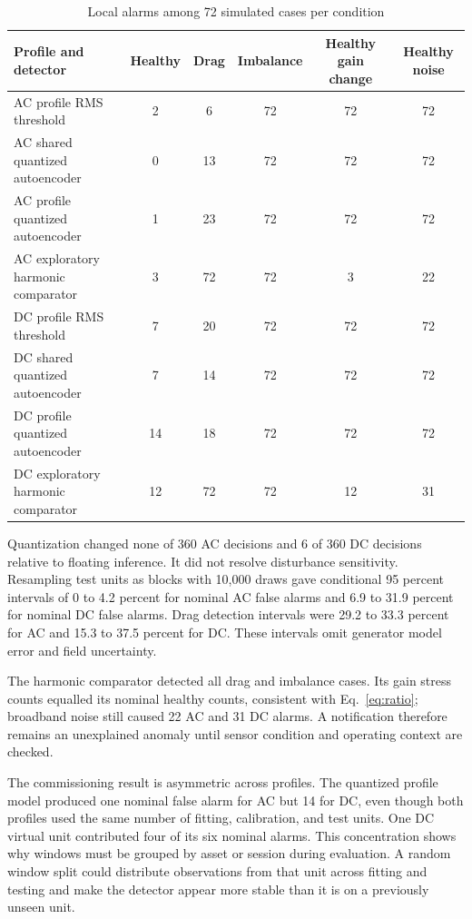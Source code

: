 \documentclass[10pt,twocolumn]{article}
\begin{document}
\begin{table}[t]
\caption{Local alarms among 72 simulated cases per condition}
\label{tab:simulation}
\centering
\footnotesize
\begin{tabular}{lccccc}
\toprule
Profile and detector & Healthy & Drag & Imbalance & Healthy gain change & Healthy noise \\
\midrule
AC profile RMS threshold & 2 & 6 & 72 & 72 & 72 \\
AC shared quantized autoencoder & 0 & 13 & 72 & 72 & 72 \\
AC profile quantized autoencoder & 1 & 23 & 72 & 72 & 72 \\
AC exploratory harmonic comparator & 3 & 72 & 72 & 3 & 22 \\
DC profile RMS threshold & 7 & 20 & 72 & 72 & 72 \\
DC shared quantized autoencoder & 7 & 14 & 72 & 72 & 72 \\
DC profile quantized autoencoder & 14 & 18 & 72 & 72 & 72 \\
DC exploratory harmonic comparator & 12 & 72 & 72 & 12 & 31 \\
\bottomrule
\end{tabular}
\end{table}

Quantization changed none of 360 AC decisions and 6 of 360 DC decisions relative to floating inference. It did not resolve disturbance sensitivity. Resampling test units as blocks with 10,000 draws gave conditional 95 percent intervals of 0 to 4.2 percent for nominal AC false alarms and 6.9 to 31.9 percent for nominal DC false alarms. Drag detection intervals were 29.2 to 33.3 percent for AC and 15.3 to 37.5 percent for DC. These intervals omit generator model error and field uncertainty.

The harmonic comparator detected all drag and imbalance cases. Its gain stress counts equalled its nominal healthy counts, consistent with Eq.~\eqref{eq:ratio}; broadband noise still caused 22 AC and 31 DC alarms. A notification therefore remains an unexplained anomaly until sensor condition and operating context are checked.

The commissioning result is asymmetric across profiles. The quantized profile model produced one nominal false alarm for AC but 14 for DC, even though both profiles used the same number of fitting, calibration, and test units. One DC virtual unit contributed four of its six nominal alarms. This concentration shows why windows must be grouped by asset or session during evaluation. A random window split could distribute observations from that unit across fitting and testing and make the detector appear more stable than it is on a previously unseen unit.
\end{document}
